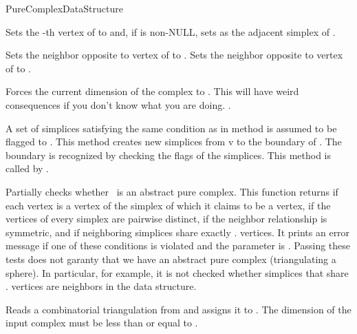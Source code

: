 \begin{ccRefConcept}{PureComplexDataStructure}
\begin{ccAdvanced}
{Sets the -th vertex of  to  and, if  is non-NULL,
sets  as the adjacent simplex of .}

{Sets the neighbor opposite to vertex  of   to
. Sets the neighbor opposite to vertex  of 
 to .}

 { Forces the current dimension
of the complex to . This will have weird consequences if you don't know
what you are doing. \ccPrecond {} \ccVar.}

{A set  of simplices satisfying the same condition as in method
\ccRefName{} is assumed to be flagged to . This
method creates new simplices from  v to the boundary of .
The boundary is recognized by checking the flags of the simplices.
This method is called by \ccRefName{}.}

\end{ccAdvanced}


{Partially checks whether \ccVar\ is an abstract pure complex. This function
returns  if each vertex is a vertex of the simplex of which it
claims to be a vertex, if the vertices of every simplex are pairwise distinct,
if the neighbor relationship is symmetric, and if neighboring simplices share
exactly \ccVar. vertices. It prints an error message
if one of these conditions is violated and the  parameter is
. Passing these tests does not garanty that we have an abstract pure
complex (triangulating a sphere). In particular, for example, it is not
checked whether simplices that share \ccVar. vertices
are neighbors in the data structure.}


{Reads a combinatorial triangulation from  and assigns it to
. \ccPrecond The dimension of the input complex must be less than or
equal to .}


\end{ccRefConcept}
